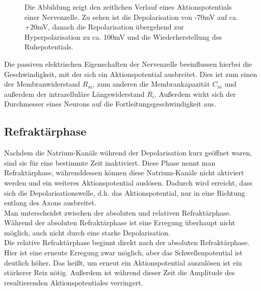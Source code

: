 \documentclass[11pt]{article}
\begin{document}
\begin{figure}[H]
\caption{Die Abbildung zeigt den zeitlichen Verlauf eines Aktionspotentials einer Nervenzelle. Zu sehen ist die Depolarisation von -70mV auf ca. +20mV, danach die Repolarisation übergehend zur Hyperpolarisation zu ca. 100mV und die Wiederherstellung des Ruhepotentials.  }
\label{ap}
\end{figure}

Die passiven elektrischen Eigenschaften der Nervenzelle beeinflussen hierbei die Geschwindigkeit, mit der sich ein Aktionspotential ausbreitet. Dies ist zum einen der Membranwiderstand $R_m$, zum anderen die Membrankapazität $C_m$ und außerdem der intrazelluläre Längswiderstand $R_i$. Außerdem wirkt sich der Durchmesser eines Neurons auf die Fortleitungsgeschwindigkeit aus.  \cite{haustiere} 

\subsection{Refraktärphase}
Nachdem die Natrium-Kanäle während der Depolarisation kurz geöffnet waren, sind sie für eine bestimmte Zeit inaktiviert. Diese Phase nennt man Refraktärphase, währenddessen können diese Natrium-Kanäle nicht aktiviert werden und ein weiteres Aktionspotential auslösen. Dadurch wird erreicht, dass sich die Depolarisationswelle, d.h. das Aktionspotential, nur in eine Richtung entlang des Axons ausbreitet.  \cite{zellbiologie} \\
Man unterscheidet zwischen der absoluten und relativen Refraktärphase. Während der absoluten Refraktärphase ist eine Erregung überhaupt nicht möglich, auch nicht durch eine starke Depolarisation. \\
Die relative Refraktärphase beginnt direkt nach der absoluten Refraktärphase. Hier ist eine erneute Erregung zwar möglich, aber das Schwellenpotential ist deutlich höher. Das heißt, um erneut ein Aktionspotential auszulösen ist ein stärkerer Reiz nötig. Außerdem ist während dieser Zeit die Amplitude des resultierenden Aktionspotentiales verringert. \cite{physiologie}
\end{document}
